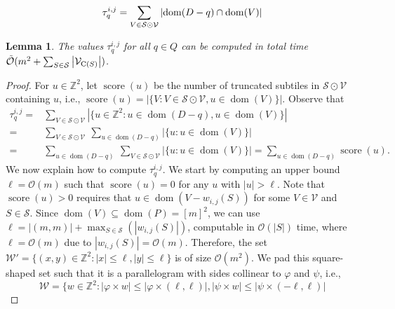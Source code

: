\documentclass[11pt, letterpaper]{article}
\theoremstyle{plain}
\newtheorem{lemma}{Lemma}
\theoremstyle{definition}
\theoremstyle{remark}
\newcommand{\Z}{\mathbb{Z}}
\renewcommand{\O}{\mathcal{O}}
\newcommand{\tO}{\tilde{\mathcal{O}}}
\renewcommand{\S}{\mathcal{S}}
\newcommand{\V}{\mathcal{V}}
\renewcommand{\phi}{\varphi}
\DeclareMathOperator*{\score}{score}
\DeclareMathOperator*{\dom}{dom}
\newcommand{\absolute}[1]{\left\lvert#1\right\rvert}
\begin{document}
\begin{align}
\label{eq:group_by_gamma}
\tau_q^{i,j} = \sum_{V \in \S \odot \V} \absolute{\d{D-q} \cap \d{V}}
\end{align}

\newcommand{\W}{\mathcal{W}}
\begin{lemma}\label{primitive_conv}
The values $\tau_q^{i,j}$ for all $q \in Q$ can be computed in total time $\tO(m^2 + \sum_{S \in \S} \absolute{\V_{\getchar{S}}})$. 
\end{lemma}
\begin{proof}
For $u \in \Z^2$, let $\score(u)$ be the number of truncated subtiles in $\S \odot \V$ containing $u$, i.e., $\score(u) = \absolute{\{V : V \in \S \odot \V, u \in \dom(V)\}}$. Observe that
%
\begin{equation}
\begin{split}
\tau_q^{i,j} =&\sum_{V \in \S \odot \V} \absolute{\{u \in \Z^2 : u \in \dom(D-q), u \in \dom(V)\}}\\
=&\sum_{V \in \S \odot \V}\ \sum_{u \in \dom(D-q)}  \absolute{\{u : u \in \dom(V)\}}\\
=&\sum_{u \in \dom(D-q)}\ \sum_{V \in \S \odot \V} \absolute{\{u : u \in \dom(V)\}} = \sum_{u \in \dom(D-q)} \score(u).
\end{split}
\end{equation}
We now explain how to compute $\tau_q^{i,j}$. 
We start by computing an upper bound $\ell = \O(m)$ such that $\score(u) = 0$ for any $u$ with $\absolute{u} > \ell$. Note that $\score(u)>0$ requires that $u \in \dom(V - w_{i,j}(S))$ for some $V \in \V$ and $S \in \S$. Since $\dom(V) \subseteq \dom(P) = [m]^2$, we can use $\ell = \absolute{(m,m)} + \max_{S \in \S}(\absolute{w_{i, j}(S)})$, computable in $\O(\absolute{S})$ time, where $\ell = \O(m)$ due to $\absolute{w_{i,j}(S)} = \O(m)$.
%
Therefore, the set $\W' = \{(x,y) \in \Z^2 : \absolute{x} \le \ell, \absolute{y} \le \ell \}$ is of size $\O(m^2)$. 
We pad this square-shaped set such that it is a parallelogram with sides collinear to $\phi$ and $\psi$, i.e., 
$$\W = \{ w \in \mathbb Z^2 : \absolute{\phi \times w} \leq \absolute{\phi \times (\ell, \ell)}, \absolute{\psi \times w} \leq \absolute{\psi \times (-\ell, \ell)}$$


\end{proof}
\end{document}
